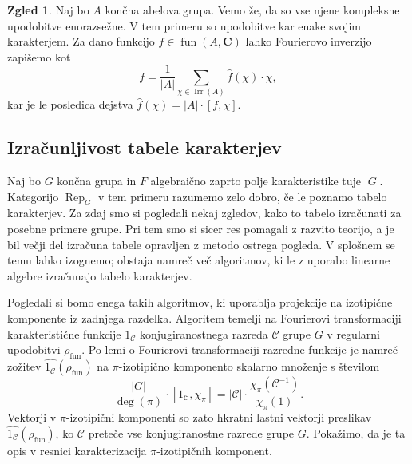 \documentclass[11pt]{book}
\def\CC{\mathbf{C}}
\def\conclass{\mathcal{C}}
\DeclareMathOperator\Rep{Rep}
\DeclareMathOperator\Irr{Irr}
\DeclareMathOperator\fun{fun}
\theoremstyle{definition}
\theoremstyle{zgled}
\newtheorem*{zgled}{Zgled}
\theoremstyle{odprtproblem}
\theoremstyle{domacanaloga}
\theoremstyle{izrek}
\begin{document}
\begin{zgled}
Naj bo $A$ končna abelova grupa. Vemo že, da so vse njene kompleksne upodobitve enorazsežne. V tem primeru so upodobitve kar enake svojim karakterjem. Za dano funkcijo $f \in \fun(A,\CC)$ lahko Fourierovo inverzijo zapišemo kot
\[
    f = \frac{1}{|A|} \sum_{\chi \in \Irr(A)} \hat{f}(\chi) \cdot \chi,
\]
kar je le posledica dejstva $\hat{f}(\chi) = |A| \cdot [ f, \chi ]$.
\end{zgled}

\subsection{Izračunljivost tabele karakterjev}

Naj bo $G$ končna grupa in $F$ algebraično zaprto polje karakteristike tuje $|G|$. Kategorijo $\Rep_G$ v tem primeru razumemo zelo dobro, če le poznamo tabelo karakterjev. Za zdaj smo si pogledali nekaj zgledov, kako to tabelo izračunati za posebne primere grupe. Pri tem smo si sicer res pomagali z razvito teorijo, a je bil večji del izračuna tabele opravljen z metodo ostrega pogleda. V splošnem se temu lahko izognemo; obstaja namreč več algoritmov, ki le z uporabo linearne algebre izračunajo tabelo karakterjev.

Pogledali si bomo enega takih algoritmov, ki uporablja projekcije na izotipične komponente iz zadnjega razdelka. Algoritem temelji na Fourierovi transformaciji karakteristične funkcije $1_{\conclass}$ konjugiranostnega razreda $\conclass$ grupe $G$ v regularni upodobitvi $\rho_{\fun}$. Po lemi o Fourierovi transformaciji razredne funkcije je namreč zožitev $\widehat{1_{\conclass}}(\rho_{\fun})$ na $\pi$-izotipično komponento skalarno množenje s številom
\[
    \frac{|G|}{\deg(\pi)} \cdot [1_{\conclass}, \chi_{\pi}] =
    |\conclass| \cdot \frac{\chi_{\pi}(\conclass^{-1})}{\chi_{\pi}(1)}.
\]
Vektorji v $\pi$-izotipični komponenti so zato hkratni lastni vektorji preslikav $\widehat{1_{\conclass}}(\rho_{\fun})$, ko $\conclass$ preteče vse konjugiranostne razrede grupe $G$. Pokažimo, da je ta opis v resnici karakterizacija $\pi$-izotipičnih komponent.
\end{document}
